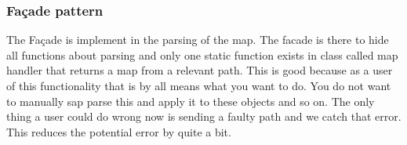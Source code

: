 \subsubsection{Façade pattern}
The Façade is implement in the parsing of the map. The facade is there to hide all functions about parsing and only one static function exists in class called map handler that returns a map from a relevant path. This is good because as a user of this functionality that is by all means what you want to do. You do not want to manually sap parse this and apply it to these objects and so on. The only thing a user could do wrong now is sending a faulty path and we catch that error. This reduces the potential error by quite a bit.